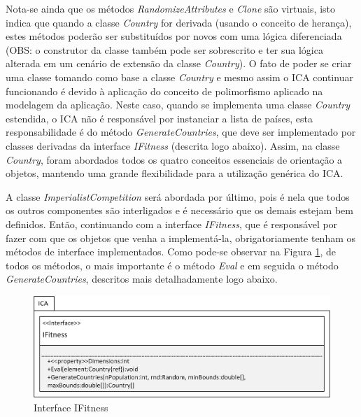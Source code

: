 Nota-se ainda que os métodos \emph{RandomizeAttributes} e \emph{Clone} são virtuais, isto indica que quando a classe \emph{Country} for derivada (usando o conceito de herança), estes métodos poderão ser substituídos por novos com uma lógica diferenciada (OBS: o construtor da classe também pode ser sobrescrito e ter sua lógica alterada em um cenário de extensão da classe \emph{Country}). O fato de poder se criar uma classe tomando como base a classe \emph{Country} e mesmo assim o ICA continuar funcionando é devido à aplicação do conceito de polimorfismo aplicado na modelagem da aplicação. Neste caso, quando se implementa uma classe\emph{ Country} estendida, o ICA não é responsável por instanciar a lista de países, esta responsabilidade é do método \emph{GenerateCountries}, que deve ser implementado por classes derivadas da interface \emph{IFitness} (descrita logo abaixo). Assim, na classe \emph{Country}, foram abordados todos os quatro conceitos essenciais de orientação a objetos, mantendo uma grande flexibilidade para a utilização genérica do ICA.    

A classe \emph{ImperialistCompetition} será abordada por último, pois é nela que todos os outros componentes são interligados e é necessário que os demais estejam bem definidos. Então, continuando com a interface \emph{IFitness}, que é responsável por fazer com que os objetos que venha a implementá-la, obrigatoriamente tenham os métodos de interface implementados. Como pode-se observar na Figura \ref{fig:ClassesICA-IFitness}, de todos os métodos, o mais importante é o método \emph{Eval} e em seguida o método \emph{GenerateCountries}, descritos mais detalhadamente logo abaixo.


\begin{figure}[h]
	\centering	
	\includegraphics[scale=1]{Figuras/ClassesICA-IFitness.png}
	\caption{Interface IFitness}
	\label{fig:ClassesICA-IFitness}
	\end{figure}


